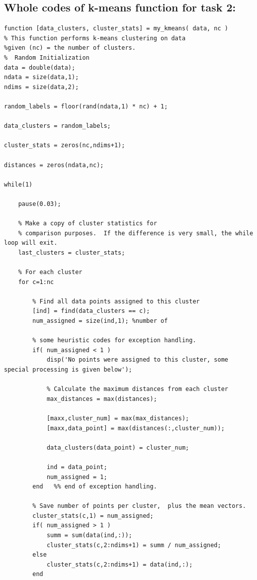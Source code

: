 \documentclass{article}
\begin{document}
\subsection*{Whole codes of k-means function for task 2:}
\begin{lstlisting}
function [data_clusters, cluster_stats] = my_kmeans( data, nc )
% This function performs k-means clustering on data 
%given (nc) = the number of clusters.
%  Random Initialization
data = double(data);
ndata = size(data,1);
ndims = size(data,2);

random_labels = floor(rand(ndata,1) * nc) + 1;

data_clusters = random_labels;

cluster_stats = zeros(nc,ndims+1);

distances = zeros(ndata,nc);

while(1)
    
    pause(0.03);
    
    % Make a copy of cluster statistics for 
    % comparison purposes.  If the difference is very small, the while loop will exit.
    last_clusters = cluster_stats;
    
    % For each cluster    
    for c=1:nc
        
        % Find all data points assigned to this cluster
        [ind] = find(data_clusters == c);
        num_assigned = size(ind,1); %number of 
        
        % some heuristic codes for exception handling. 
        if( num_assigned < 1 )
            disp('No points were assigned to this cluster, some special processing is given below');
            
            % Calculate the maximum distances from each cluster
            max_distances = max(distances);
            
            [maxx,cluster_num] = max(max_distances);
            [maxx,data_point] = max(distances(:,cluster_num));
            
            data_clusters(data_point) = cluster_num;
            
            ind = data_point;
            num_assigned = 1;
        end   %% end of exception handling.   
        
        % Save number of points per cluster,  plus the mean vectors.
        cluster_stats(c,1) = num_assigned;
        if( num_assigned > 1 )
            summ = sum(data(ind,:));
            cluster_stats(c,2:ndims+1) = summ / num_assigned;
        else
            cluster_stats(c,2:ndims+1) = data(ind,:);
        end
        

\end{lstlisting}
\end{document}
